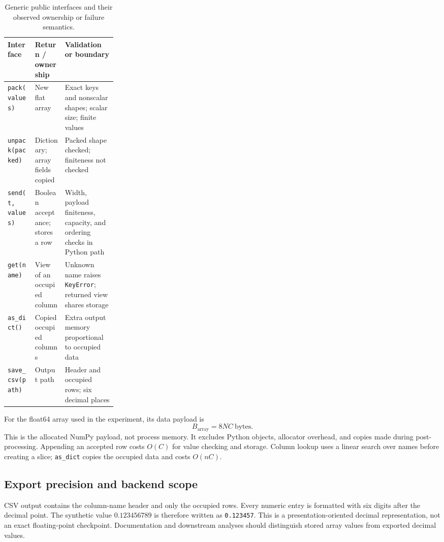 \documentclass[11pt,a4paper]{article}
\newcommand{\code}[1]{\texttt{#1}}
\begin{document}
\begin{table}[t]
\caption{Generic public interfaces and their observed ownership or failure semantics.}
\label{tab:api}
\small
\begin{tabularx}{\linewidth}{@{}P{0.25\linewidth}YY@{}}
\toprule
Interface & Return / ownership & Validation or boundary \\
\midrule
\code{pack(values)} & New flat array & Exact keys and nonscalar shapes; scalar size; finite values \\
\code{unpack(packed)} & Dictionary; array fields copied & Packed shape checked; finiteness not checked \\
\code{send(t, values)} & Boolean acceptance; stores a row & Width, payload finiteness, capacity, and ordering checks in Python path \\
\code{get(name)} & View of an occupied column & Unknown name raises \code{KeyError}; returned view shares storage \\
\code{as\_dict()} & Copied occupied columns & Extra output memory proportional to occupied data \\
\code{save\_csv(path)} & Output path & Header and occupied rows; six decimal places \\
\bottomrule
\end{tabularx}
\end{table}

For the float64 array used in the experiment, its data payload is
\begin{equation}
B_{\mathrm{array}}=8NC\ \mathrm{bytes}.
\label{eq:memory}
\end{equation}
This is the allocated NumPy payload, not process memory. It excludes Python objects, allocator overhead, and copies made during post-processing. Appending an accepted row costs $O(C)$ for value checking and storage. Column lookup uses a linear search over names before creating a slice; \code{as\_dict} copies the occupied data and costs $O(nC)$.

\subsection{Export precision and backend scope}
CSV output contains the column-name header and only the occupied rows. Every numeric entry is formatted with six digits after the decimal point. The synthetic value $0.123456789$ is therefore written as \code{0.123457}. This is a presentation-oriented decimal representation, not an exact floating-point checkpoint. Documentation and downstream analyses should distinguish stored array values from exported decimal values.
\end{document}
